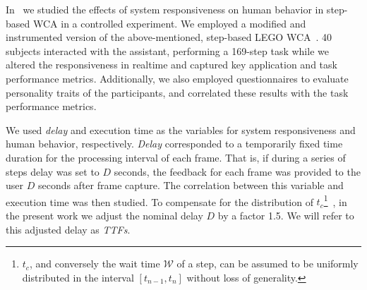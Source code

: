 In~\cite{olguinmunoz2021impact} we studied the effects of system responsiveness on human behavior in step-based \gls{WCA} in a controlled experiment.
We employed a modified and instrumented version of the above-mentioned, step-based LEGO \gls{WCA}~\cite{chen2015early}.
\num{40} subjects interacted with the assistant, performing a \num{169}-step task while we altered the responsiveness in realtime and captured key application and task performance metrics.
Additionally, we also employed questionnaires to evaluate personality traits of the participants, and correlated these results with the task performance metrics.

We used \emph{delay} and execution time as the variables for system responsiveness and human behavior, respectively.
\emph{Delay} corresponded to a temporarily fixed time duration for the processing interval of each frame.
That is, if during a series of steps delay was set to \( D \) seconds, the feedback for each frame was provided to the user \( D \) seconds after frame capture.
The correlation between this variable and execution time was then studied.
To compensate for the distribution of \( t_c \)\footnote{\( t_c \), and conversely the wait time \( \mathcal{W} \) of a step, can be assumed to be uniformly distributed in the interval \( [t_{n - 1}, t_n] \) without loss of generality.}~\cite{olguinmunoz2021impact}, in the present work we adjust the nominal delay \( D \) by a factor \num{1.5}.
We will refer to this adjusted delay as \emph{\glspl{TTF}}.



